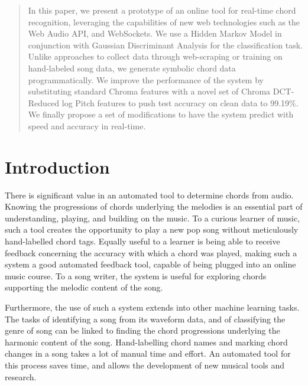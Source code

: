 \documentclass{article}
\begin{document}

\begin{abstract}
In this paper, we present a prototype of an online tool for real-time chord
recognition, leveraging the capabilities of new web technologies such as the Web
Audio API, and WebSockets. We use a Hidden Markov Model in conjunction with
Gaussian Discriminant Analysis for the classification task. Unlike approaches to
collect data through web-scraping or training on hand-labeled song data, we
generate symbolic chord data programmatically. We improve the performance of
the system by substituting standard Chroma features with a novel set of
Chroma DCT-Reduced log Pitch features to push test accuracy on clean data to
99.19\%. We finally propose a set of modifications to have the system predict
with speed and accuracy in real-time.
\end{abstract}

\section{Introduction}
\label{intro}
There is significant value in an automated tool to determine chords from audio.
Knowing the progressions of chords underlying the melodies is an essential part
of understanding, playing, and building on the music. To a curious learner of
music, such a tool creates the opportunity to play a new pop song without
meticulously hand-labelled chord tags. Equally useful to a learner is being able
to receive feedback concerning the accuracy with which a chord was played,
making such a system a good automated feedback tool, capable of being plugged
into an online music course. To a song writer, the system is useful for exploring
chords supporting the melodic content of the song.

Furthermore, the use of such a system extends into other machine learning tasks.
The tasks of identifying a song from its waveform data, and of classifying the
genre of song can be linked to finding the chord progressions underlying the
harmonic content of the song. Hand-labelling chord names and marking chord
changes in a song takes a lot of manual time and effort. An automated tool for
this process saves time, and allows the development of new musical tools and
research.
\end{document}
